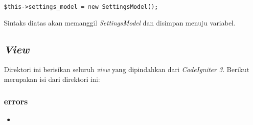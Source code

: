 \begin{center}
\verb|$this->settings_model = new SettingsModel();|
\end{center}

Sintaks diatas akan memanggil \textit{SettingsModel} dan disimpan menuju variabel.

\subsection{\textit{View}}
Direktori ini berisikan seluruh \textit{view} yang dipindahkan dari \textit{CodeIgniter 3}. Berikut merupakan isi dari direktori ini:
\subsubsection{errors}
\begin{itemize}
	\item \texttt{}
\end{itemize}
